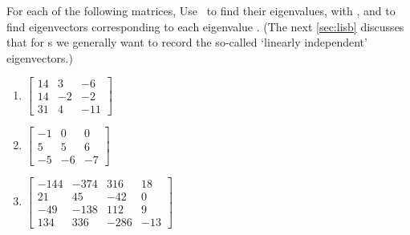 \begin{exercise} \label{ex:} 
For each of the following matrices, Use \script\ to find their eigenvalues, with , and to find eigenvectors corresponding to each eigenvalue \twodp.  
(The next \autoref{sec:lisb} discusses that for s we generally want to record the so-called `linearly independent' eigenvectors.)
\begin{enumerate}
\item \(\begin{bmatrix} 14 & 3 & -6
\\14 & -2 & -2
\\31 & 4 & -11 \end{bmatrix}\)
\setbox\ajrqrbox\hbox{}\marginpar{\usebox{\ajrqrbox}}%

\item \(\begin{bmatrix} -1 & 0 & 0
\\5 & 5 & 6
\\-5 & -6 & -7 \end{bmatrix}\)
\setbox\ajrqrbox\hbox{}\marginpar{\usebox{\ajrqrbox}}%

\item \(\begin{bmatrix} -144 & -374 & 316 & 18
\\21 & 45 & -42 & 0
\\-49 & -138 & 112 & 9
\\134 & 336 & -286 & -13 \end{bmatrix}\)
\setbox\ajrqrbox\hbox{}\marginpar{\usebox{\ajrqrbox}}%


\end{enumerate}
\end{exercise}
